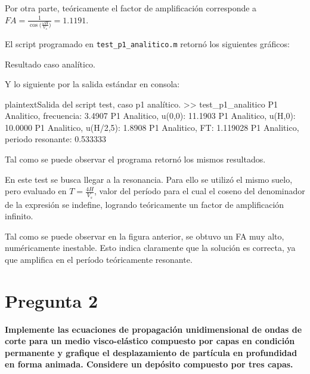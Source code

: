 Por otra parte, teóricamente el factor de amplificación corresponde a $FA=\frac{1}{\cos\bigg(\frac{\omega H}{V_s}\bigg)} = 1.1191$.

El script programado en \texttt{test\_p1\_analitico.m} retornó los siguientes gráficos:

\begin{images}{Resultado caso analítico.}
\end{images}

Y lo siguiente por la salida estándar en consola:

\begin{sourcecode}{plaintext}{Salida del script test, caso p1 analítico.}
>> test_p1_analitico
P1 Analitico, frecuencia: 3.4907
P1 Analitico, u(0,0): 11.1903
P1 Analitico, u(H,0): 10.0000
P1 Analitico, u(H/2,5): 1.8908
P1 Analitico, FT: 1.119028
P1 Analitico, periodo resonante: 0.533333
\end{sourcecode}

Tal como se puede observar el programa retornó los mismos resultados.

\newpage
{}

En este test se busca llegar a la resonancia. Para ello se utilizó el mismo suelo, pero evaluado en $T=\frac{4H}{V_s}$, valor del período para el cual el coseno del denominador de la expresión se indefine, logrando teóricamente un factor de amplificación infinito.


Tal como se puede observar en la figura anterior, se obtuvo un FA muy alto, numéricamente inestable. Esto indica claramente que la solución es correcta, ya que amplifica en el período teóricamente resonante.

\newpage
\section{Pregunta 2}

\textbf{Implemente las ecuaciones de propagación unidimensional de ondas de corte para un medio visco-elástico compuesto por capas en condición permanente y grafique el desplazamiento de partícula en profundidad en forma animada. Considere un depósito compuesto por tres capas.} \\


